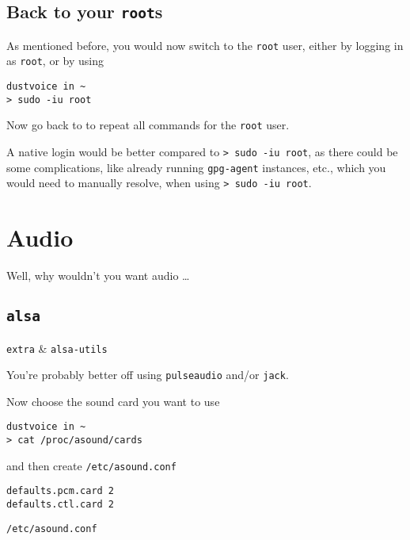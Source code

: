 \documentclass[10pt]{dustdoc}
\begin{document}
\subsection{Back to your \texttt{root}s}%
\label{sec:back-to-your-roots}

As mentioned before, you would now switch to the \texttt{root} user, either by logging in as \texttt{root}, or by using

\begin{verbatim}
dustvoice in ~
> sudo -iu root
\end{verbatim}


Now go back to  to repeat all commands for the \texttt{root} user.

\begin{WARNING}
    A native login would be better compared to \texttt{> sudo -iu root}, as there could be some complications, like already running \texttt{gpg-agent} instances, etc., which you would need to manually resolve, when using \texttt{> sudo -iu root}.
\end{WARNING}

\section{Audio}%
\label{sec:audio}

Well, why wouldn’t you want audio \ldots

\subsection{\texttt{alsa}}%
\label{sec:alsa}

\begin{pkgtable}
    \texttt{extra} & \texttt{alsa-utils} \\
\end{pkgtable}

\begin{NOTE}
    You’re probably better off using \texttt{pulseaudio} and/or \texttt{jack}.
\end{NOTE}

Now choose the sound card you want to use

\begin{verbatim}
dustvoice in ~
> cat /proc/asound/cards
\end{verbatim}


\noindent
and then create \texttt{/etc/asound.conf}

\begin{mintedlisting}
    \begin{verbatim}
defaults.pcm.card 2
defaults.ctl.card 2
    \end{verbatim}

    \caption{\texttt{/etc/asound.conf}}
\end{mintedlisting}
\end{document}
